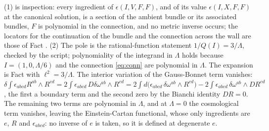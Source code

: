 (1) is inspection: every ingredient of $\epsilon(I, V, F, F)$, and of its value $\epsilon(I, X, F, F)$ at the canonical solution, is a section of the ambient bundle or its associated bundles, $F$ is polynomial in the connection, and no metric inverse occurs; the locators for the continuation of the bundle and the connection across the wall are those of Fact .
(2) The pole is the rational-function statement $1/Q(I) = 3/\Lambda$, checked by the script; polynomiality of the integrand in $\Lambda$ holds because $I = (1, 0, \Lambda/6)$ and the connection \eqref{eq:conn} are polynomial in $\Lambda$. The expansion is Fact  with $\ell^2 = 3/\Lambda$. The interior variation of the Gauss-Bonnet term vanishes: $\delta\int\epsilon_{abcd}R^{ab}\wedge R^{cd} = 2\int\epsilon_{abcd}\,D\delta\omega^{ab}\wedge R^{cd} = 2\int d\bigl(\epsilon_{abcd}\,\delta\omega^{ab}\wedge R^{cd}\bigr) - 2\int \epsilon_{abcd}\,\delta\omega^{ab}\wedge DR^{cd}$, the first a boundary term and the second zero by the Bianchi identity $DR = 0$. The remaining two terms are polynomial in $\Lambda$, and at $\Lambda = 0$ the cosmological term vanishes, leaving the Einstein-Cartan functional, whose only ingredients are $e$, $R$ and $\epsilon_{abcd}$: no inverse of $e$ is taken, so it is defined at degenerate $e$.
